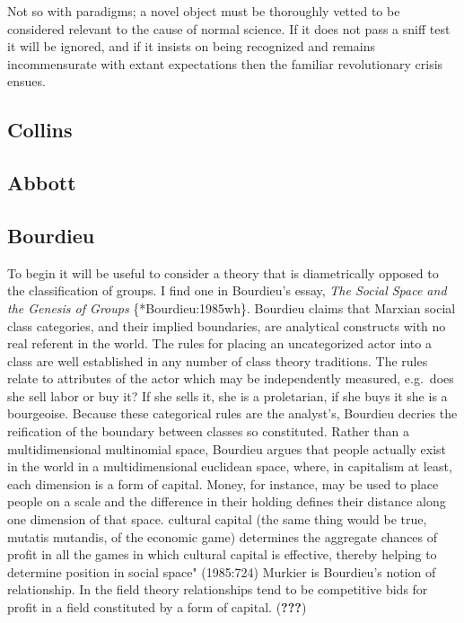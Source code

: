Not so with paradigms; a novel object must be thoroughly vetted to be
considered relevant to the cause of normal science. If it does not pass
a sniff test it will be ignored, and if it insists on being recognized
and remains incommensurate with extant expectations then the familiar
revolutionary crisis ensues.

\subsection{Collins}\label{collins}

\subsection{Abbott}\label{abbott}

\subsection{Bourdieu}\label{bourdieu}

To begin it will be useful to consider a theory that is diametrically
opposed to the classification of groups. I find one in Bourdieu's essay,
\emph{The Social Space and the Genesis of Groups} \{*Bourdieu:1985wh\}.
Bourdieu claims that Marxian social class categories, and their implied
boundaries, are analytical constructs with no real referent in the
world. The rules for placing an uncategorized actor into a class are
well established in any number of class theory traditions. The rules
relate to attributes of the actor which may be independently measured,
e.g.~does she sell labor or buy it? If she sells it, she is a
proletarian, if she buys it she is a bourgeoise. Because these
categorical rules are the analyst's, Bourdieu decries the reification of
the boundary between classes so constituted. Rather than a
multidimensional multinomial space, Bourdieu argues that people actually
exist in the world in a multidimensional euclidean space, where, in
capitalism at least, each dimension is a form of capital. Money, for
instance, may be used to place people on a scale and the difference in
their holding defines their distance along one dimension of that space.
cultural capital (the same thing would be true, mutatis mutandis, of the
economic game) determines the aggregate chances of profit in all the
games in which cultural capital is effective, thereby helping to
determine position in social space" (1985:724) Murkier is Bourdieu's
notion of relationship. In the field theory relationships tend to be
competitive bids for profit in a field constituted by a form of capital.
({\textbf{???}})

